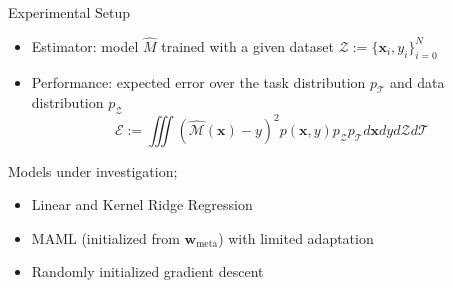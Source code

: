 \documentclass[aspectratio=169]{beamer}
\begin{document}
\begin{frame}{Experimental Setup}
{\begin{minipage}{\textwidth}
\begin{minipage}{0.5\textwidth}
    \end{minipage}
  \end{minipage}
  }
  {
    \begin{itemize}
      \item Estimator: model $\hat{M}$ trained  with a given dataset $\mathcal{Z}:=\{\mathbf{x}_i, y_i\}_{i=0}^{N}$
      \item Performance: expected error over the task distribution $p_\mathcal{T}$ and data distribution $p_\mathcal{Z}$
      \begin{equation}\label{eq:ee}
    \mathcal{E}:= \iiint(\mathcal{\hat{M}}(\mathbf{x}) - y)^2 p(\mathbf{x}, y)p_{\mathcal{Z}} p_{\mathcal{T}} d\mathbf{x} dy d\mathcal{Z} d\mathcal{T}
      \end{equation}
    \end{itemize}
  }
  {
    Models under investigation;
    \begin{itemize}
      \item Linear and Kernel Ridge Regression
      \item MAML (initialized from $\mathbf{w}_\text{meta}$) with limited adaptation 
      \item Randomly initialized gradient descent 
    \end{itemize}
  }
\end{frame}
\end{document}

